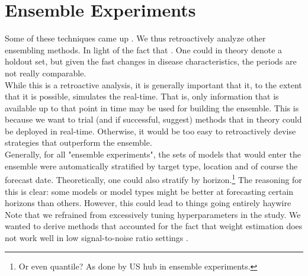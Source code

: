 \section{Ensemble Experiments}
Some of these techniques came up . We thus retroactively analyze other ensembling methods. In light of the fact that . One could in theory denote a holdout set, but given the fast changes in disease characteristics, the periods are not really comparable.\\ 
While this is a retroactive analysis, it is generally important that it, to the extent that it is possible, simulates the real-time. That is, only information that is available up to that point in time may be used for building the ensemble. This is because we want to trial (and if successful, suggest) methods that in theory could be deployed in real-time. Otherwise, it would be too easy to retroactively devise strategies that outperform the ensemble.\\
Generally, for all "ensemble experiments", the sets of models that would enter the ensemble were automatically stratified by target type, location and of course the forecast date. Theoretically, one could also stratify by horizon.\footnote{Or even quantile? As done by US hub in ensemble experiments.} The reasoning for this is clear: some models or model types might be better at forecasting certain horizons than others. However, this could lead to things going entirely haywire \\
Note that we refrained from excessively tuning hyperparameters in the study.
We wanted to derive methods that accounted for the fact that weight estimation does not work well in low signal-to-noise ratio settings \cite{claeskens_forecast_2016}.\\
